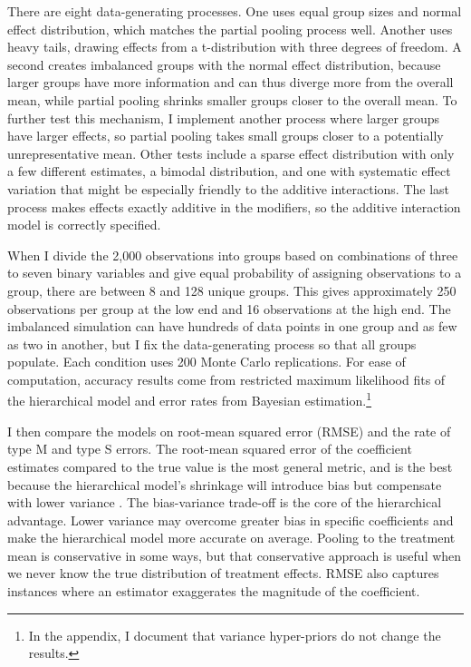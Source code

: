 \documentclass[12pt]{article}
\begin{document}
 
There are eight data-generating processes. 
One uses equal group sizes and normal effect distribution, which matches the partial pooling process well.
Another uses heavy tails, drawing effects from a t-distribution with three degrees of freedom.
A second creates imbalanced groups with the normal effect distribution, because larger groups have more information and can thus diverge more from the overall mean, while partial pooling shrinks smaller groups closer to the overall mean. 
To further test this mechanism, I implement another process where larger groups have larger effects, so partial pooling takes small groups closer to a potentially unrepresentative mean.
Other tests include a sparse effect distribution with only a few different estimates, a bimodal distribution, and one with systematic effect variation that might be especially friendly to the additive interactions.
The last process makes effects exactly additive in the modifiers, so the additive interaction model is correctly specified.


When I divide the 2,000 observations into groups based on combinations of three to seven binary variables and give equal probability of assigning observations to a group, there are between 8 and 128 unique groups. 
This gives approximately 250 observations per group at the low end and 16 observations at the high end.
The imbalanced simulation can have hundreds of data points in one group and as few as two in another, but I fix the data-generating process so that all groups populate.
Each condition uses 200 Monte Carlo replications. 
For ease of computation, accuracy results come from restricted maximum likelihood fits of the hierarchical model and error rates from Bayesian estimation.\footnote{In the appendix, I document that variance hyper-priors do not change the results.}


I then compare the models on root-mean squared error (RMSE) and the rate of type M and type S errors. 
The root-mean squared error of the coefficient estimates compared to the true value is the most general metric, and is the best because the hierarchical model's shrinkage will introduce bias but compensate with lower variance \citep{EfronMorris1975, CliffordRainey2024}.
The bias-variance trade-off is the core of the hierarchical advantage. 
Lower variance may overcome greater bias in specific coefficients and make the hierarchical model more accurate on average.
Pooling to the treatment mean is conservative in some ways, but that conservative approach is useful when we never know the true distribution of treatment effects.
RMSE also captures instances where an estimator exaggerates the magnitude of the coefficient.
\end{document}
